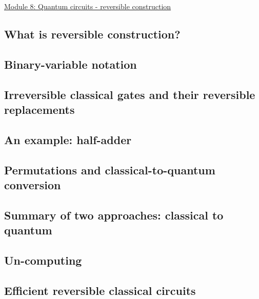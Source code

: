 \documentclass[main.tex]{subfiles}
\begin{document}
\href{https://www2.seas.gwu.edu/~simhaweb/quantum/modules/module8/module8.html}{Module 8: Quantum circuits - reversible construction}

\subsection{What is reversible construction?}

\subsection{Binary-variable notation}

\subsection{Irreversible classical gates and their reversible replacements}

\subsection{An example: half-adder}

\subsection{Permutations and classical-to-quantum conversion}

\subsection{Summary of two approaches: classical to quantum}

\subsection{Un-computing}

\subsection{Efficient reversible classical circuits}
\end{document}
